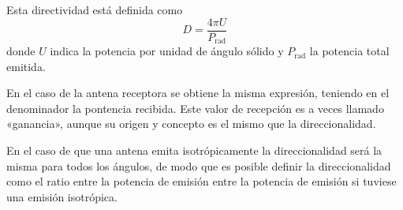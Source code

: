 Esta directividad está definida como
\begin{equation}
    D = \frac{4\pi U}{P_\text{rad}}
\end{equation}
donde $U$ indica la potencia por unidad de ángulo sólido y $P_\text{rad}$ la potencia total emitida.

En el caso de la antena receptora se obtiene la misma expresión, teniendo en el denominador la pontencia recibida.
Este valor de recepción es a veces llamado «ganancia», aunque su origen y concepto es el mismo que la direccionalidad.

En el caso de que una antena emita isotrópicamente la direccionalidad será la misma para todos los ángulos, de modo que es posible definir la direccionalidad como el ratio entre la potencia de emisión entre la potencia de emisión si tuviese una emisión isotrópica.

